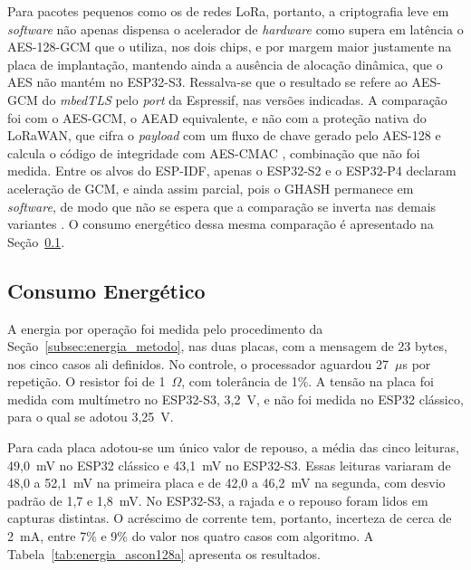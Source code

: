 Para pacotes pequenos como os de redes LoRa, portanto, a criptografia leve em \textit{software} não apenas dispensa o acelerador de \textit{hardware} como supera em latência o AES-128-GCM que o utiliza, nos dois chips, e por margem maior justamente na placa de implantação, mantendo ainda a ausência de alocação dinâmica, que o AES não mantém no ESP32-S3. Ressalva-se que o resultado se refere ao AES-GCM do \textit{mbedTLS} pelo \textit{port} da Espressif, nas versões indicadas. A comparação foi com o AES-GCM, o AEAD equivalente, e não com a proteção nativa do LoRaWAN, que cifra o \textit{payload} com um fluxo de chave gerado pelo AES-128 e calcula o código de integridade com AES-CMAC \cite{lorawan104}, combinação que não foi medida. Entre os alvos do ESP-IDF, apenas o ESP32-S2 e o ESP32-P4 declaram aceleração de GCM, e ainda assim parcial, pois o GHASH permanece em \textit{software}, de modo que não se espera que a comparação se inverta nas demais variantes \cite{espressif2026idf}. O consumo energético dessa mesma comparação é apresentado na Seção~\ref{subsec:energia_resultados}.


\subsection{Consumo Energético}
\label{subsec:energia_resultados}

A energia por operação foi medida pelo procedimento da Seção~\ref{subsec:energia_metodo}, nas duas placas, com a mensagem de 23 bytes, nos cinco casos ali definidos. No controle, o processador aguardou 27~$\mu$s por repetição. O resistor foi de 1~$\Omega$, com tolerância de 1\%. A tensão na placa foi medida com multímetro no ESP32-S3, 3,2~V, e não foi medida no ESP32 clássico, para o qual se adotou 3,25~V.

Para cada placa adotou-se um único valor de repouso, a média das cinco leituras, 49,0~mV no ESP32 clássico e 43,1~mV no ESP32-S3. Essas leituras variaram de 48,0 a 52,1~mV na primeira placa e de 42,0 a 46,2~mV na segunda, com desvio padrão de 1,7 e 1,8~mV. No ESP32-S3, a rajada e o repouso foram lidos em capturas distintas. O acréscimo de corrente tem, portanto, incerteza de cerca de 2~mA, entre 7\% e 9\% do valor nos quatro casos com algoritmo. A Tabela~\ref{tab:energia_ascon128a} apresenta os resultados.

